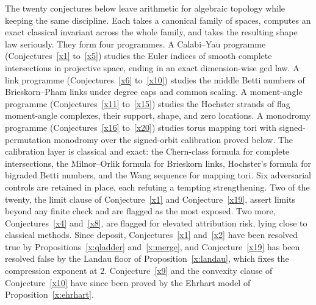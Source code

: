 \documentclass[11pt]{article}
\theoremstyle{definition}
\begin{document}
The twenty conjectures below leave arithmetic for algebraic topology while keeping the same discipline.  Each takes a canonical family of spaces, computes an exact classical invariant across the whole family, and takes the resulting shape law seriously.  They form four programmes.  A Calabi--Yau programme (Conjectures~\ref{x1} to~\ref{x5}) studies the Euler indices of smooth complete intersections in projective space, ending in an exact dimension-wise gcd law.  A link programme (Conjectures~\ref{x6} to~\ref{x10}) studies the middle Betti numbers of Brieskorn--Pham links under degree caps and common scaling.  A moment-angle programme (Conjectures~\ref{x11} to~\ref{x15}) studies the Hochster strands of flag moment-angle complexes, their support, shape, and zero locations.  A monodromy programme (Conjectures~\ref{x16} to~\ref{x20}) studies torus mapping tori with signed-permutation monodromy over the signed-orbit calibration proved below.  The calibration layer is classical and exact: the Chern-class formula for complete intersections, the Milnor--Orlik formula for Brieskorn links, Hochster's formula for bigraded Betti numbers, and the Wang sequence for mapping tori.  Six adversarial controls are retained in place, each refuting a tempting strengthening.  Two of the twenty, the limit clause of Conjecture~\ref{x1} and Conjecture~\ref{x19}, assert limits beyond any finite check and are flagged as the most exposed.  Two more, Conjectures~\ref{x4} and~\ref{x8}, are flagged for elevated attribution risk, lying close to classical methods.  Since deposit, Conjectures~\ref{x1} and~\ref{x2} have been resolved true by Propositions~\ref{x:qladder} and~\ref{x:merge}, and Conjecture~\ref{x19} has been resolved false by the Landau floor of Proposition~\ref{x:landau}, which fixes the compression exponent at $2$.  Conjecture~\ref{x9} and the convexity clause of Conjecture~\ref{x10} have since been proved by the Ehrhart model of Proposition~\ref{x:ehrhart}.
\end{document}
